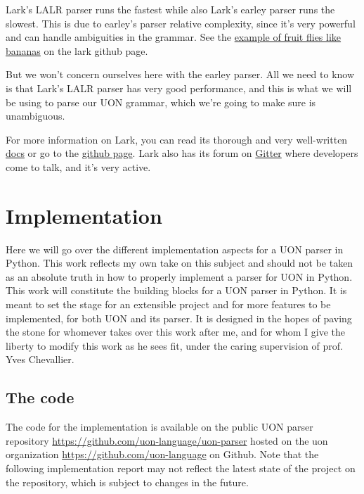 \documentclass[12pt]{article}
\begin{document}
Lark's LALR parser runs the fastest while also Lark's earley parser runs the slowest. This is due to earley's parser relative complexity, since it's very powerful and can handle ambiguities in the grammar. See the \href{https://github.com/lark-parser/lark/blob/master/examples/fruitflies.py}{example of fruit flies like bananas} on the lark github page.

But we won't concern ourselves here with the earley parser. All we need to know is that Lark's LALR parser has very good performance, and this is what we will be using to parse our UON grammar, which we're going to make sure is unambiguous.

For more information on Lark, you can read its thorough and very well-written \href{https://lark-parser.readthedocs.io/en/latest/}{docs} or go to the \href{https://github.com/lark-parser/lark}{github page}. Lark also has its forum on \href{https://gitter.im/lark-parser/Lobby}{Gitter} where developers come to talk, and it's very active.

\pagebreak

\section{Implementation}
Here we will go over the different implementation aspects for a UON parser in Python. This work reflects my own take on this subject and should not be taken as an absolute truth in how to properly implement a parser for UON in Python. This work will constitute the building blocks for a UON parser in Python. It is meant to set the stage for an extensible project and for more features to be implemented, for both UON and its parser. It is designed in the hopes of paving the stone for whomever takes over this work after me, and for whom I give the liberty to modify this work as he sees fit, under the caring supervision of prof. Yves Chevallier.

\subsection{The code}
The code for the implementation is available on the public UON parser repository \url{https://github.com/uon-language/uon-parser} hosted on the uon organization \url{https://github.com/uon-language} on Github. Note that the following implementation report may not reflect the latest state of the project on the repository, which is subject to changes in the future.

\pagebreak
\end{document}
